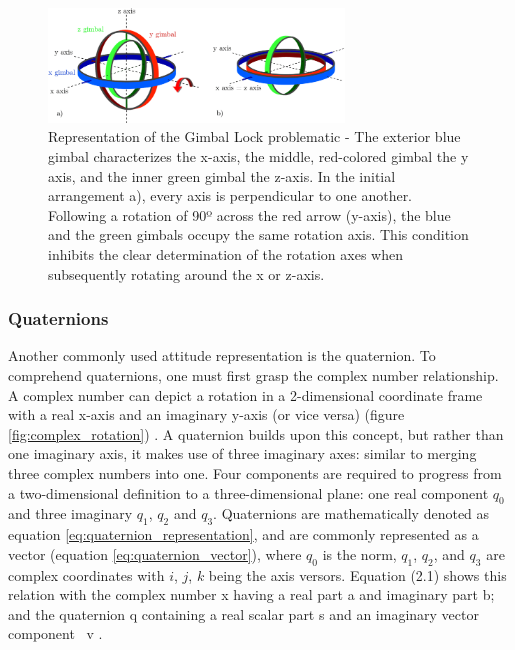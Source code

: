 \begin{figure}[!h]
    \centering
    \includegraphics[width=0.7\textwidth]{figures/gimbal_lock.png}
    \caption{Representation of the Gimbal Lock problematic \cite{zeitlhofler2019nominal} - The exterior blue gimbal characterizes the x-axis, the middle, red-colored gimbal the y axis, and the inner green gimbal the z-axis. In the initial arrangement a), every axis is perpendicular to one another. Following a rotation of 90º across the red arrow (y-axis), the blue and the green gimbals occupy the same rotation axis. This condition inhibits the clear determination of the rotation axes when subsequently rotating around the x or z-axis. }
    \label{fig:gimbal_lock}
\end{figure}

\subsubsection{Quaternions}

Another commonly used attitude representation is the quaternion. To comprehend quaternions, one must first grasp the complex number relationship. A complex number can depict a rotation in a 2-dimensional coordinate frame with a real x-axis and an imaginary y-axis (or vice versa) (figure \ref{fig:complex_rotation}) \cite{lee2008representing}. A quaternion builds upon this concept, but rather than one imaginary axis, it makes use of three imaginary axes: similar to merging three complex numbers into one. Four components are required to progress from a two-dimensional definition to a three-dimensional plane: one real component $q_0$ and three imaginary $q_1$, $q_2$ and $q_3$. Quaternions are mathematically denoted as equation \ref{eq:quaternion_representation}, and are commonly represented as a vector (equation \ref{eq:quaternion_vector}), where $q_0$ is the norm, $q_1$, $q_2$, and $q_3$ are complex coordinates with $i$, $j$, $k$ being the axis versors. Equation (2.1) shows this relation with the complex number x having a real part a and imaginary part b; and the quaternion q containing a real scalar part s and an imaginary vector component ~v \cite{mukundan2002quaternions}.

